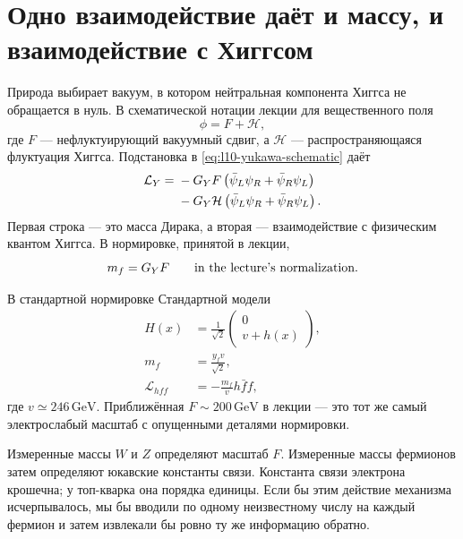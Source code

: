\section{Одно взаимодействие даёт и массу, и взаимодействие с Хиггсом}

Природа выбирает вакуум, в котором нейтральная компонента Хиггса не обращается в нуль. В схематической нотации лекции для вещественного поля
\begin{equation}
  \phi=F+\mathcal H ,
  \label{eq:l10-f-plus-h}
\end{equation}
где \(F\) — нефлуктуирующий вакуумный сдвиг, а \(\mathcal H\) — распространяющаяся флуктуация Хиггса. Подстановка в
\eqref{eq:l10-yukawa-schematic} даёт
\begin{align}
  \mathcal L_Y
  ={}&
  -G_YF
  \left(\bar\psi_L\psi_R+\bar\psi_R\psi_L\right)
  \notag\\
  &-G_Y\mathcal H
  \left(\bar\psi_L\psi_R+\bar\psi_R\psi_L\right).
  \label{eq:l10-yukawa-split}
\end{align}
Первая строка — это масса Дирака, а вторая — взаимодействие с физическим квантом Хиггса. В нормировке, принятой в лекции,
\begin{equation}
  m_f=G_YF
  \qquad\hbox{in the lecture's normalization.}
  \label{eq:l10-mass-lecture-normalization}
\end{equation}

В стандартной нормировке Стандартной модели
\begin{equation}
\begin{aligned}
  H(x)&=\frac{1}{\sqrt2}
  \begin{pmatrix}
    0\\ v+h(x)
  \end{pmatrix},
  \\
  m_f&=\frac{y_fv}{\sqrt2},
  \\
  \mathcal L_{hff}&=-\frac{m_f}{v}h\bar f f,
\end{aligned}
  \label{eq:l10-standard-higgs-normalization}
\end{equation}
где \(v\simeq246\,\mathrm{GeV}\). Приближённая
\(F\sim200\,\mathrm{GeV}\) в лекции — это тот же самый электрослабый масштаб с опущенными деталями нормировки.

Измеренные массы \(W\) и \(Z\) определяют масштаб \(F\). Измеренные массы фермионов затем определяют юкавские константы связи. Константа связи электрона крошечна; у топ-кварка она порядка единицы. Если бы этим действие механизма исчерпывалось, мы бы вводили по одному неизвестному числу на каждый фермион и затем извлекали бы ровно ту же информацию обратно.

